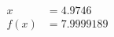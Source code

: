 \documentclass[preview]{standalone}
\begin{document}
\begin{align*}
x &= 4.9746\\f(x) &= 7.9999189
\end{align*}
\end{document}

